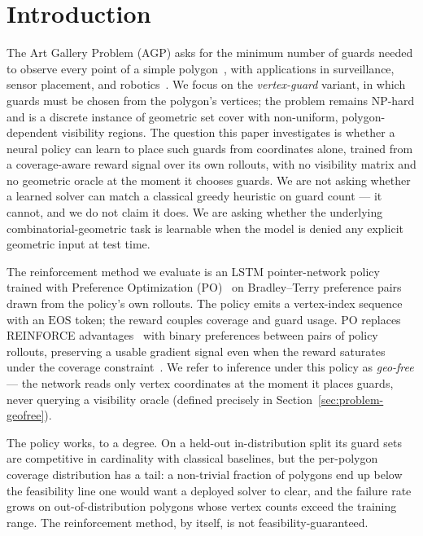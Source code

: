 \documentclass[preprint,10pt]{elsarticle}
\newcommand{\EOS}{\mathrm{EOS}}
\begin{document}
\newpage

\section{Introduction}
\label{sec:intro}

The Art Gallery Problem (AGP) asks for the minimum number of guards needed to observe every point of a simple polygon~\cite{LeeLin1986,ORourke1987AGT}, with applications in surveillance, sensor placement, and robotics~\cite{1545170,DBLP:journals/evi/BighamDK22}. We focus on the \emph{vertex-guard} variant, in which guards must be chosen from the polygon's vertices; the problem remains NP-hard and is a discrete instance of geometric set cover with non-uniform, polygon-dependent visibility regions. The question this paper investigates is whether a neural policy can learn to place such guards from coordinates alone, trained from a coverage-aware reward signal over its own rollouts, with no visibility matrix and no geometric oracle at the moment it chooses guards. We are not asking whether a learned solver can match a classical greedy heuristic on guard count --- it cannot, and we do not claim it does. We are asking whether the underlying combinatorial-geometric task is learnable when the model is denied any explicit geometric input at test time.

The reinforcement method we evaluate is an LSTM pointer-network policy trained with Preference Optimization (PO)~\cite{Pan2025PO} on Bradley--Terry preference pairs~\cite{BradleyTerry1952} drawn from the policy's own rollouts. The policy emits a vertex-index sequence with an $\EOS$ token; the reward couples coverage and guard usage. PO replaces REINFORCE advantages~\cite{Williams1992,Bello2016} with binary preferences between pairs of policy rollouts, preserving a usable gradient signal even when the reward saturates under the coverage constraint~\cite{Pan2025PO}. We refer to inference under this policy as \emph{geo-free} --- the network reads only vertex coordinates at the moment it places guards, never querying a visibility oracle (defined precisely in Section~\ref{sec:problem-geofree}).

The policy works, to a degree. On a held-out in-distribution split its guard sets are competitive in cardinality with classical baselines, but the per-polygon coverage distribution has a tail: a non-trivial fraction of polygons end up below the feasibility line one would want a deployed solver to clear, and the failure rate grows on out-of-distribution polygons whose vertex counts exceed the training range. The reinforcement method, by itself, is not feasibility-guaranteed.
\end{document}
